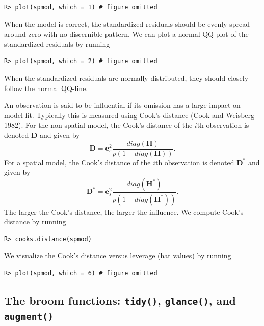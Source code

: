 \documentclass{article}
\begin{document}
\begin{verbatim}
R> plot(spmod, which = 1) # figure omitted
\end{verbatim}

When the model is correct, the standardized residuals should be evenly
spread around zero with no discernible pattern. We can plot a normal
QQ-plot of the standardized residuals by running

\begin{verbatim}
R> plot(spmod, which = 2) # figure omitted
\end{verbatim}

When the standardized residuals are normally distributed, they should
closely follow the normal QQ-line.

An observation is said to be influential if its omission has a large
impact on model fit. Typically this is measured using Cook's distance
(Cook and Weisberg 1982). For the non-spatial model, the Cook's distance
of the \(i\)th observation is denoted \(\mathbf{D}\) and given by
\begin{equation*}
  \mathbf{D} = \mathbf{e}_{s}^2 \frac{diag(\mathbf{H})}{p(1 - diag(\mathbf{H}))} .
\end{equation*} For a spatial model, the Cook's distance of the \(i\)th
observation is denoted \(\mathbf{D}^*\) and given by \begin{equation*}
  \mathbf{D}^* = \mathbf{e}_{s}^2 \frac{diag(\mathbf{H}^*)}{p(1 - diag(\mathbf{H}^*))} .
\end{equation*} The larger the Cook's distance, the larger the
influence. We compute Cook's distance by running

\begin{verbatim}
R> cooks.distance(spmod)
\end{verbatim}

We visualize the Cook's distance versus leverage (hat values) by running

\begin{verbatim}
R> plot(spmod, which = 6) # figure omitted
\end{verbatim}

\hypertarget{the-broom-functions-tidy-glance-and-augment}{%
\subsection{\texorpdfstring{The broom functions: \texttt{tidy()},
\texttt{glance()}, and
\texttt{augment()}}{The broom functions: tidy(), glance(), and augment()}}\label{the-broom-functions-tidy-glance-and-augment}}
\end{document}
